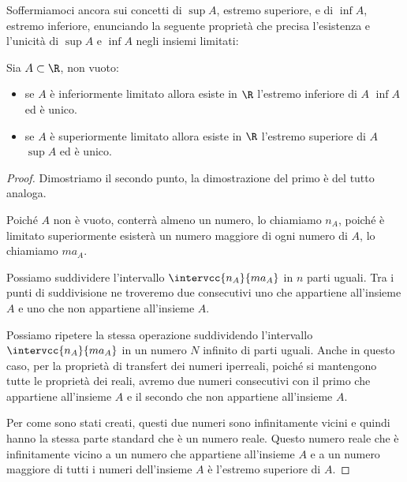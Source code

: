 Soffermiamoci ancora sui concetti di \(\sup{A}\), estremo superiore, e 
di \(\inf{A}\), 
estremo inferiore, enunciando la seguente proprietà che precisa l'esistenza 
e l'unicità di \(\sup{A}\) e \(\inf{A}\) negli insiemi limitati:
\begin{newtheo}
Sia \(A\subset\R\), non vuoto:
\begin{itemize} [nosep]
\item se \(A\) è inferiormente limitato allora esiste in \(\R\) 
l'estremo inferiore di \(A\) \(\inf{A}\) ed è unico.
\item se \(A\) è superiormente limitato allora esiste in \(\R\) 
l'estremo superiore di \(A\) \(\sup{A}\) ed è unico.
\end{itemize}
\end{newtheo}
\begin{proof}
Dimostriamo il secondo punto, la dimostrazione del primo è del tutto 
analoga.

Poiché \(A\) non è vuoto, conterrà almeno un numero, lo chiamiamo \(n_A\), 
poiché è limitato superiormente esisterà un numero maggiore di ogni numero 
di \(A\), lo chiamiamo \(ma_A\).

Possiamo suddividere l'intervallo \(\intervcc{n_A}{ma_A}\) in \(n\) parti 
uguali.
Tra i punti di suddivisione ne troveremo due consecutivi uno che appartiene 
all'insieme \(A\) e uno che non appartiene all'insieme \(A\).

Possiamo  ripetere la stessa operazione suddividendo l'intervallo 
\(\intervcc{n_A}{ma_A}\) in un numero \(N\) infinito di parti uguali.
Anche in questo caso, per la proprietà di transfert dei numeri iperreali, 
poiché si mantengono tutte le proprietà dei reali, avremo due numeri 
consecutivi con il primo che appartiene all'insieme \(A\) e il secondo che 
non appartiene all'insieme \(A\).

Per come sono stati creati, questi due numeri sono infinitamente vicini e 
quindi hanno la stessa parte standard che è un numero reale.
Questo numero reale che è infinitamente vicino a un numero che appartiene 
all'insieme \(A\) e a un numero maggiore di tutti i numeri dell'insieme 
\(A\) è l'estremo superiore di \(A\).
\end{proof}


